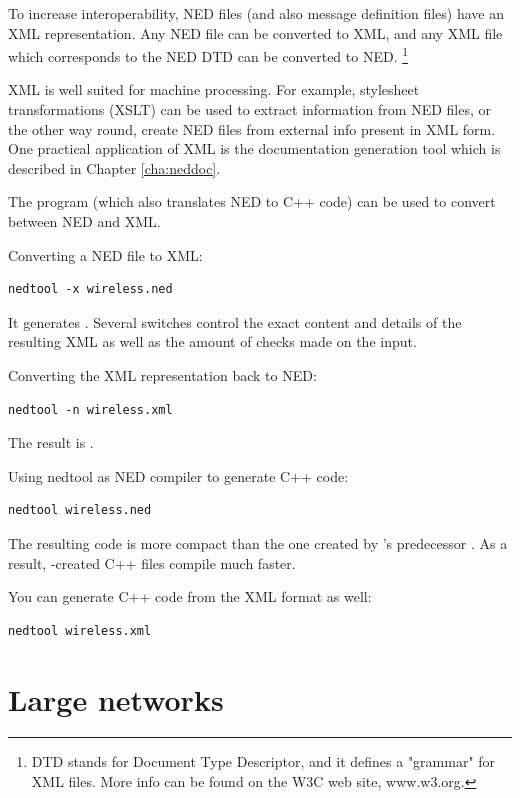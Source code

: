 To increase interoperability, NED files (and also message definition files)
have an XML representation. Any NED file can be converted to XML, and
any XML file which corresponds to the NED DTD can be converted to NED.
  \footnote{DTD stands for Document Type Descriptor, and it defines
  a "grammar" for XML files. More info can be found on the W3C web site,
  www.w3.org.}

XML is well suited for machine processing. For example, stylesheet
transformations (XSLT) can be used to extract information from NED files,
or the other way round, create NED files from external info present in
XML form. One practical application of XML is the 
documentation generation tool which is described in Chapter \ref{cha:neddoc}.

The  program (which also translates NED to C++ code)
can be used to convert between NED and XML.

Converting a NED file to XML:

\begin{verbatim}
nedtool -x wireless.ned
\end{verbatim}

It generates .
Several switches control the exact content and details
of the resulting XML as well as the amount of checks
made on the input.

Converting the XML representation back to NED:

\begin{verbatim}
nedtool -n wireless.xml
\end{verbatim}

The result is .

Using nedtool as NED compiler to generate C++ code:

\begin{verbatim}
nedtool wireless.ned
\end{verbatim}

The resulting code is more compact than the
one created by 's predecessor .
As a result, -created 
C++ files compile much faster.

You can generate C++ code from the XML format as well:

\begin{verbatim}
nedtool wireless.xml
\end{verbatim}



\section{Large networks}

